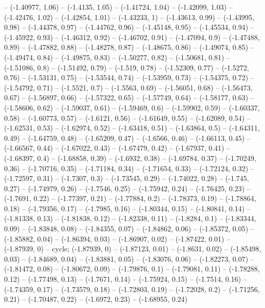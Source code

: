 -- (-1.40977, 1.06)
-- (-1.4135, 1.05)
-- (-1.41724, 1.04)
-- (-1.42099, 1.03)
-- (-1.42476, 1.02)
-- (-1.42854, 1.01)
-- (-1.43233, 1)
-- (-1.43613, 0.99)
-- (-1.43995, 0.98)
-- (-1.44378, 0.97)
-- (-1.44762, 0.96)
-- (-1.45148, 0.95)
-- (-1.45534, 0.94)
-- (-1.45922, 0.93)
-- (-1.46312, 0.92)
-- (-1.46702, 0.91)
-- (-1.47094, 0.9)
-- (-1.47488, 0.89)
-- (-1.47882, 0.88)
-- (-1.48278, 0.87)
-- (-1.48675, 0.86)
-- (-1.49074, 0.85)
-- (-1.49474, 0.84)
-- (-1.49875, 0.83)
-- (-1.50277, 0.82)
-- (-1.50681, 0.81)
-- (-1.51086, 0.8)
-- (-1.51492, 0.79)
-- (-1.519, 0.78)
-- (-1.52309, 0.77)
-- (-1.5272, 0.76)
-- (-1.53131, 0.75)
-- (-1.53544, 0.74)
-- (-1.53959, 0.73)
-- (-1.54375, 0.72)
-- (-1.54792, 0.71)
-- (-1.5521, 0.7)
-- (-1.5563, 0.69)
-- (-1.56051, 0.68)
-- (-1.56473, 0.67)
-- (-1.56897, 0.66)
-- (-1.57322, 0.65)
-- (-1.57749, 0.64)
-- (-1.58177, 0.63)
-- (-1.58606, 0.62)
-- (-1.59037, 0.61)
-- (-1.59469, 0.6)
-- (-1.59902, 0.59)
-- (-1.60337, 0.58)
-- (-1.60773, 0.57)
-- (-1.6121, 0.56)
-- (-1.61649, 0.55)
-- (-1.62089, 0.54)
-- (-1.62531, 0.53)
-- (-1.62974, 0.52)
-- (-1.63418, 0.51)
-- (-1.63864, 0.5)
-- (-1.64311, 0.49)
-- (-1.64759, 0.48)
-- (-1.65209, 0.47)
-- (-1.6566, 0.46)
-- (-1.66113, 0.45)
-- (-1.66567, 0.44)
-- (-1.67022, 0.43)
-- (-1.67479, 0.42)
-- (-1.67937, 0.41)
-- (-1.68397, 0.4)
-- (-1.68858, 0.39)
-- (-1.6932, 0.38)
-- (-1.69784, 0.37)
-- (-1.70249, 0.36)
-- (-1.70716, 0.35)
-- (-1.71184, 0.34)
-- (-1.71654, 0.33)
-- (-1.72124, 0.32)
-- (-1.72597, 0.31)
-- (-1.7307, 0.3)
-- (-1.73545, 0.29)
-- (-1.74022, 0.28)
-- (-1.745, 0.27)
-- (-1.74979, 0.26)
-- (-1.7546, 0.25)
-- (-1.75942, 0.24)
-- (-1.76425, 0.23)
-- (-1.7691, 0.22)
-- (-1.77397, 0.21)
-- (-1.77884, 0.2)
-- (-1.78373, 0.19)
-- (-1.78864, 0.18)
-- (-1.79356, 0.17)
-- (-1.7985, 0.16)
-- (-1.80344, 0.15)
-- (-1.80841, 0.14)
-- (-1.81338, 0.13)
-- (-1.81838, 0.12)
-- (-1.82338, 0.11)
-- (-1.8284, 0.1)
-- (-1.83344, 0.09)
-- (-1.83848, 0.08)
-- (-1.84355, 0.07)
-- (-1.84862, 0.06)
-- (-1.85372, 0.05)
-- (-1.85882, 0.04)
-- (-1.86394, 0.03)
-- (-1.86907, 0.02)
-- (-1.87422, 0.01)
-- (-1.87939, 0)
-- cycle;
\drawBand (-1.87939, 0)
-- (-1.87123, 0.01)
-- (-1.8631, 0.02)
-- (-1.85498, 0.03)
-- (-1.84689, 0.04)
-- (-1.83881, 0.05)
-- (-1.83076, 0.06)
-- (-1.82273, 0.07)
-- (-1.81472, 0.08)
-- (-1.80672, 0.09)
-- (-1.79876, 0.1)
-- (-1.79081, 0.11)
-- (-1.78288, 0.12)
-- (-1.77498, 0.13)
-- (-1.7671, 0.14)
-- (-1.75924, 0.15)
-- (-1.7514, 0.16)
-- (-1.74359, 0.17)
-- (-1.73579, 0.18)
-- (-1.72803, 0.19)
-- (-1.72028, 0.2)
-- (-1.71256, 0.21)
-- (-1.70487, 0.22)
-- (-1.6972, 0.23)
-- (-1.68955, 0.24)

